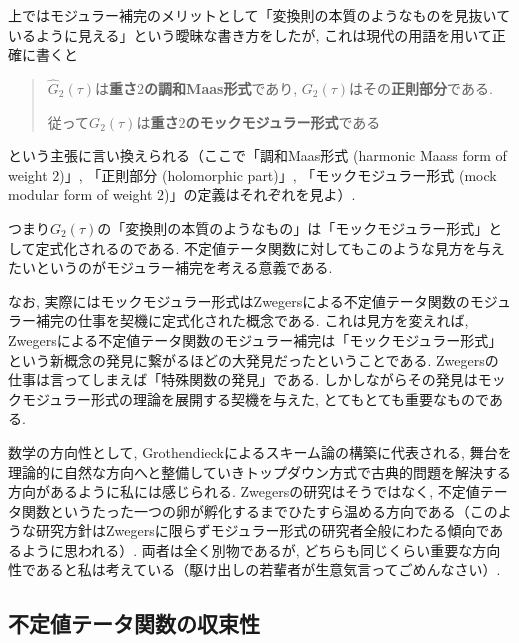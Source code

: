 \documentclass[11pt,b5paper,oneside,lualatex]{ltjsarticle} %
\numberwithin{equation}{section} %
\begin{document}
\begin{rem}
	上ではモジュラー補完のメリットとして「変換則の本質のようなものを見抜いているように見える」という曖昧な書き方をしたが, これは現代の用語を用いて正確に書くと
	\begin{quote}
		\centering
		$ \widehat{G}_2 (\tau) $は\textbf{重さ$ 2 $の調和Maas形式}であり, 
		$ G_2 (\tau) $はその\textbf{正則部分}である. 
		
		従って$ G_2 (\tau) $は\textbf{重さ$ 2 $のモックモジュラー形式}である
	\end{quote}
	という主張に言い換えられる（ここで「調和Maas形式 (harmonic Maass form of weight $ 2 $)」, 「正則部分 (holomorphic part)」, 「モックモジュラー形式 (mock modular form of weight $ 2 $)」の定義はそれぞれ\cite[Definition 4.2, Definition 4.4, Definition 5.16 i)]{BFOR}を見よ）. 
	
	つまり$ G_2 (\tau) $の「変換則の本質のようなもの」は「モックモジュラー形式」として定式化されるのである. 
	不定値テータ関数に対してもこのような見方を与えたいというのがモジュラー補完を考える意義である. 
	
	なお, 実際にはモックモジュラー形式はZwegersによる不定値テータ関数のモジュラー補完の仕事を契機に定式化された概念である. 
	これは見方を変えれば, Zwegersによる不定値テータ関数のモジュラー補完は「モックモジュラー形式」という新概念の発見に繋がるほどの大発見だったということである. 
	Zwegersの仕事は言ってしまえば「特殊関数の発見」である. 
	しかしながらその発見はモックモジュラー形式の理論を展開する契機を与えた, とてもとても重要なものである. 
	
	数学の方向性として, Grothendieckによるスキーム論の構築に代表される, 舞台を理論的に自然な方向へと整備していきトップダウン方式で古典的問題を解決する方向があるように私には感じられる. 
	Zwegersの研究はそうではなく, 不定値テータ関数というたった一つの卵が孵化するまでひたすら温める方向である（このような研究方針はZwegersに限らずモジュラー形式の研究者全般にわたる傾向であるように思われる）. 
	両者は全く別物であるが, どちらも同じくらい重要な方向性であると私は考えている（駆け出しの若輩者が生意気言ってごめんなさい）. 
\end{rem}



\subsection{不定値テータ関数の収束性} \label{subsec:indefinite_theta_convergency}
\end{document}
